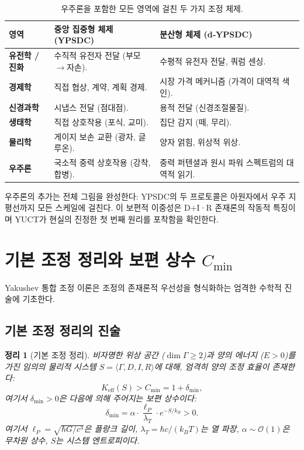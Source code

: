 \documentclass[11pt,a4paper]{article}
\newtheorem{theorem}{정리}
\begin{document}
\begin{table}[htbp]
	\centering
	\caption{우주론을 포함한 모든 영역에 걸친 두 가지 조정 체제.}
	\label{tab:two-regimes-full}
	\begin{tabular}{p{2.5cm}p{4.5cm}p{4.5cm}}
		\toprule
		\textbf{영역} & \textbf{중앙 집중형 체제 (YPSDC)} & \textbf{분산형 체제 (d‑YPSDC)} \\
		\midrule
		\textbf{유전학 / 진화} &
		수직적 유전자 전달 (부모$\to$자손). &
		수평적 유전자 전달, 쿼럼 센싱. \\
		\midrule
		\textbf{경제학} &
		직접 협상, 계약, 계획 경제. &
		시장 가격 메커니즘 (가격이 대역적 색인). \\
		\midrule
		\textbf{신경과학} &
		시냅스 전달 (점대점). &
		용적 전달 (신경조절물질). \\
		\midrule
		\textbf{생태학} &
		직접 상호작용 (포식, 교미). &
		집단 감지 (떼, 무리). \\
		\midrule
		\textbf{물리학} &
		게이지 보손 교환 (광자, 글루온). &
		양자 얽힘, 위상적 위상. \\
		\midrule
		\textbf{우주론} &
		국소적 중력 상호작용 (강착, 합병). &
		중력 퍼텐셜과 원시 파워 스펙트럼의 대역적 읽기. \\
		\bottomrule
	\end{tabular}
\end{table}

\noindent
우주론의 추가는 전체 그림을 완성한다: YPSDC의 두 프로토콜은 아원자에서 우주 지평선까지 모든 스케일에 걸친다. 이 보편적 이중성은 D+I·R 존재론의 작동적 특징이며 YUCT가 현실의 진정한 첫 번째 원리를 포착함을 확인한다.

\section{기본 조정 정리와 보편 상수 \texorpdfstring{$C_{\min}$}{C\_min}}
\label{sec:fundamental-theorem}

Yakushev 통합 조정 이론은 조정의 존재론적 우선성을 형식화하는 엄격한 수학적 진술에 기초한다.

\subsection{기본 조정 정리의 진술}

\begin{theorem}[기본 조정 정리]
	비자명한 위상 공간 ($\dim\Gamma \geq 2$)과 양의 에너지 ($E > 0$)를 가진 임의의 물리적 시스템 $S = \langle \Gamma, D, I, R \rangle$에 대해, 엄격히 양의 조정 효율이 존재한다:
	\begin{equation}
		\boxed{K_{\mathrm{eff}}(S) > C_{\min} = 1 + \delta_{\min}},
	\end{equation}
	여기서 $\delta_{\min} > 0$은 다음에 의해 주어지는 보편 상수이다:
	\begin{equation}
		\delta_{\min} = \alpha \cdot \frac{\ell_P}{\lambda_T} \cdot e^{-S/k_B} > 0.
		\label{eq:delta-min}
	\end{equation}
	여기서 $\ell_P = \sqrt{\hbar G / c^3}$은 플랑크 길이, $\lambda_T = \hbar c / (k_B T)$는 열 파장, $\alpha \sim \mathcal{O}(1)$은 무차원 상수, $S$는 시스템 엔트로피이다.
\end{theorem}
\end{document}
